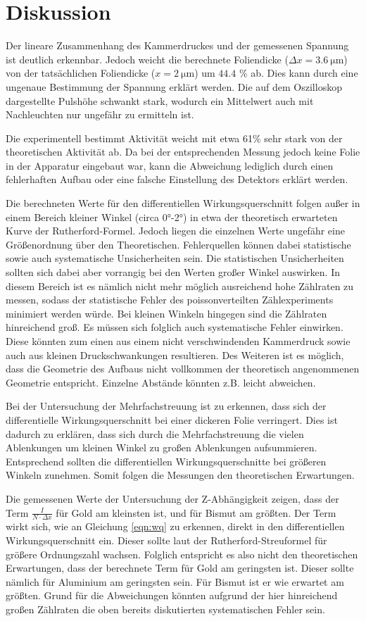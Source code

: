 \section{Diskussion}
\label{sec:Diskussion}
Der lineare Zusammenhang des Kammerdruckes und der gemessenen Spannung ist deutlich erkennbar. Jedoch weicht die
berechnete Foliendicke ($\Delta x = \SI{3.6}{\micro\meter}$) von der tatsächlichen Foliendicke ($x = \SI{2}{\micro\meter}$)
um $44.4$ \% ab. Dies kann durch eine ungenaue Bestimmung der Spannung erklärt werden. Die auf dem Oszilloskop
dargestellte Pulshöhe schwankt stark, wodurch ein Mittelwert auch mit Nachleuchten nur ungefähr zu ermitteln ist.

Die experimentell bestimmt Aktivität weicht mit etwa 61\% sehr stark von der theoretischen Aktivität ab.
Da bei der entsprechenden Messung jedoch keine Folie in der Apparatur eingebaut war,
kann die Abweichung lediglich durch einen fehlerhaften Aufbau oder eine falsche
Einstellung des Detektors erklärt werden.

Die berechneten Werte für den differentiellen Wirkungsquerschnitt folgen außer in
einem Bereich kleiner Winkel (circa 0°-2°) in etwa der theoretisch erwarteten Kurve
der Rutherford-Formel. Jedoch liegen die einzelnen Werte ungefähr eine Größenordnung
über den Theoretischen. Fehlerquellen können dabei statistische sowie auch systematische
Unsicherheiten sein. Die statistischen Unsicherheiten sollten sich dabei aber vorrangig bei
den Werten großer Winkel auswirken. In diesem Bereich ist es nämlich nicht mehr möglich
ausreichend hohe Zählraten zu messen, sodass der statistische Fehler des poissonverteilten
Zählexperiments minimiert werden würde. Bei kleinen Winkeln hingegen sind die Zählraten hinreichend
groß. Es müssen sich folglich auch systematische Fehler einwirken. Diese könnten
zum einen aus einem nicht verschwindenden Kammerdruck sowie auch aus kleinen Druckschwankungen
resultieren. Des Weiteren ist es möglich, dass die Geometrie des Aufbaus nicht vollkommen der
theoretisch angenommenen Geometrie entspricht. Einzelne Abstände könnten z.B. leicht abweichen.

Bei der Untersuchung der Mehrfachstreuung ist zu erkennen, dass sich der differentielle Wirkungsquerschnitt
bei einer dickeren Folie verringert. Dies ist dadurch zu erklären, dass sich durch die
Mehrfachstreuung die vielen Ablenkungen um kleinen Winkel zu großen Ablenkungen aufsummieren.
Entsprechend sollten die differentiellen Wirkungsquerschnitte bei größeren Winkeln zunehmen.
Somit folgen die Messungen den theoretischen Erwartungen.

Die gemessenen Werte der Untersuchung der Z-Abhängigkeit zeigen, dass der Term $\frac{I}{N\cdot \Delta x}$
für Gold am kleinsten ist, und für Bismut am größten. Der Term wirkt sich, wie an
Gleichung \ref{eqn:wq} zu erkennen, direkt in den differentiellen Wirkungsquerschnitt ein.
Dieser sollte laut der Rutherford-Streuformel für größere Ordnungszahl wachsen.
Folglich entspricht es also nicht den theoretischen Erwartungen, dass der berechnete
Term für Gold am geringsten ist. Dieser sollte nämlich für Aluminium am geringsten sein.
Für Bismut ist er wie erwartet am größten. Grund für die Abweichungen könnten aufgrund
der hier hinreichend großen Zählraten die oben bereits diskutierten systematischen
Fehler sein.
